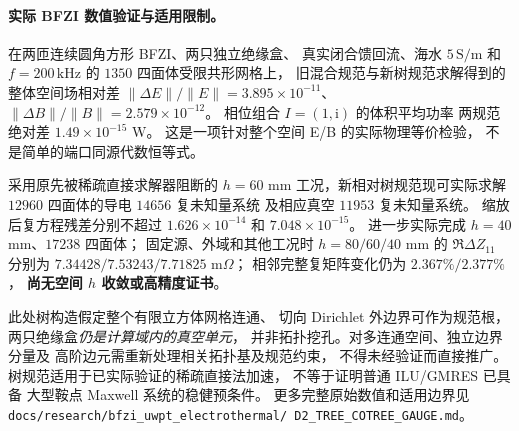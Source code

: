 \paragraph{实际 BFZI 数值验证与适用限制。}
在两匝连续圆角方形 BFZI、两只独立绝缘盒、
真实闭合馈回流、海水 $5\,\mathrm{S/m}$ 和
$f=200\,\mathrm{kHz}$ 的 $1350$ 四面体受限共形网格上，
旧混合规范与新树规范求解得到的整体空间场相对差
$\|\Delta E\|/\|E\|=3.895\times10^{-11}$、
$\|\Delta B\|/\|B\|=2.579\times10^{-12}$。
相位组合 $I=(1,\mathrm i)$ 的体积平均功率
两规范绝对差 $1.49\times10^{-15}$ W。
这是一项针对整个空间 E/B 的实际物理等价检验，
不是简单的端口同源代数恒等式。

采用原先被稀疏直接求解器阻断的 $h=60$ mm
工况，新相对树规范现可实际求解
$12960$ 四面体的导电 $14656$ 复未知量系统
及相应真空 $11953$ 复未知量系统。
缩放后复方程残差分别不超过
$1.626\times10^{-14}$ 和 $7.048\times10^{-15}$。
进一步实际完成 $h=40$ mm、$17238$ 四面体；
固定源、外域和其他工况时 $h=80/60/40$ mm
的 $\Re\Delta Z_{11}$ 分别为
$7.34428/7.53243/7.71825$ m$\Omega$；
相邻完整复矩阵变化仍为 $2.367\%/2.377\%$，
\textbf{尚无空间 $h$ 收敛或高精度证书}。

此处树构造假定整个有限立方体网格连通、
切向 Dirichlet 外边界可作为规范根，
两只绝缘盒\emph{仍是计算域内的真空单元}，
并非拓扑挖孔。对多连通空间、独立边界分量及
高阶边元需重新处理相关拓扑基及规范约束，
不得未经验证而直接推广。
树规范适用于已实际验证的稀疏直接法加速，
不等于证明普通 ILU/GMRES 已具备
大型鞍点 Maxwell 系统的稳健预条件。
更多完整原始数值和适用边界见
\texttt{docs/research/bfzi\_uwpt\_electrothermal/
D2\_TREE\_COTREE\_GAUGE.md}。

